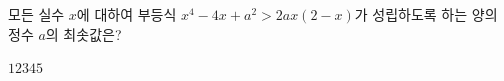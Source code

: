 모든 실수 $x$에 대하여 부등식 $x^4-4x+a^2>2ax(2-x)$가 성립하도록 하는 양의 정수 $a$의 최솟값은?
\begin{choices32}{$1$}{$2$}{$3$}{$4$}{$5$}\end{choices32}
